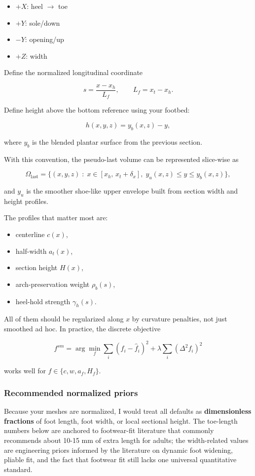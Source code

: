 \documentclass[
  10.5pt,
]{article}
\providecommand{\tightlist}{%
  \setlength{\itemsep}{0pt}\setlength{\parskip}{0pt}}
\begin{document}
\begin{itemize}
\tightlist
\item
  \(+X\): heel \(\rightarrow\) toe
\item
  \(+Y\): sole/down
\item
  \(-Y\): opening/up
\item
  \(+Z\): width
\end{itemize}

Define the normalized longitudinal coordinate

\[
s = \frac{x-x_h}{L_f}, \qquad L_f=x_t-x_h.
\]

Define height above the bottom reference using your footbed:

\[
h(x,y,z) = y_b(x,z)-y,
\]

where \(y_b\) is the blended plantar surface from the previous section.

With this convention, the pseudo-last volume can be represented
slice-wise as

\[
\Omega_{\text{last}}=\Big\{(x,y,z)\;:\; x\in[x_h,\,x_t+\delta_x],\;
y_u(x,z)\le y \le y_b(x,z)\Big\},
\]

and \(y_u\) is the smoother shoe-like upper envelope built from section
width and height profiles.

The profiles that matter most are:

\begin{itemize}
\tightlist
\item
  centerline \(c(x)\),
\item
  half-width \(a_t(x)\),
\item
  section height \(H(x)\),
\item
  arch-preservation weight \(\rho_b(s)\),
\item
  heel-hold strength \(\gamma_h(s)\).
\end{itemize}

All of them should be regularized along \(x\) by curvature penalties,
not just smoothed ad hoc. In practice, the discrete objective

\[
f^{sm}=\arg\min_f \sum_i (f_i-\hat f_i)^2 + \lambda \sum_i (\Delta^2 f_i)^2
\]

works well for \(f\in\{c,w,a_f,H_f\}\).

\subsubsection{Recommended normalized
priors}\label{recommended-normalized-priors}

Because your meshes are normalized, I would treat all defaults as
\textbf{dimensionless fractions} of foot length, foot width, or local
sectional height. The toe-length numbers below are anchored to
footwear-fit literature that commonly recommends about 10-15 mm of extra
length for adults; the width-related values are engineering priors
informed by the literature on dynamic foot widening, pliable fit, and
the fact that footwear fit still lacks one universal quantitative
standard.
\end{document}
